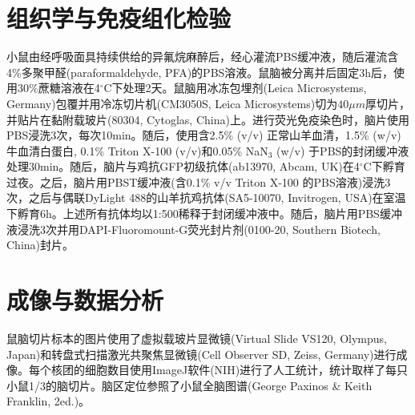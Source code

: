 \section{组织学与免疫组化检验}
小鼠由经呼吸面具持续供给的异氟烷麻醉后，经心灌流PBS缓冲液，随后灌流含4\%多聚甲醛(paraformaldehyde, PFA)的PBS溶液。鼠脑被分离并后固定3h后，使用30\%蔗糖溶液在4$^\circ$C下处理2天。鼠脑用冰冻包埋剂(Leica Microsystems, Germany)包覆并用冷冻切片机(CM3050S, Leica Microsystems)切为$40\mu m$厚切片，并贴片在黏附载玻片(80304, Cytoglas, China)上。进行荧光免疫染色时，脑片使用PBS浸洗3次，每次10min。随后，使用含2.5\% (v/v) 正常山羊血清，1.5\% (w/v) 牛血清白蛋白, 0.1\% Triton\texttrademark{} X-100 (v/v)和0.05\% NaN$_3$ (w/v) 于PBS的封闭缓冲液处理30min。随后，脑片与鸡抗GFP初级抗体(ab13970, Abcam, UK)在4$^\circ$C下孵育过夜。之后，脑片用PBST缓冲液(含0.1\% v/v Triton\texttrademark{} X-100 的PBS溶液)浸洗3次，之后与偶联DyLight 488的山羊抗鸡抗体(SA5-10070, Invitrogen, USA)在室温下孵育6h。上述所有抗体均以1:500稀释于封闭缓冲液中。随后，脑片用PBS缓冲液浸洗3次并用DAPI-Fluoromount-G荧光封片剂(0100-20, Southern Biotech, China)封片。

\section{成像与数据分析}
鼠脑切片标本的图片使用了虚拟载玻片显微镜(Virtual Slide VS120, Olympus, Japan)和转盘式扫描激光共聚焦显微镜(Cell Observer SD, Zeiss, Germany)进行成像。每个核团的细胞数目使用ImageJ软件(NIH)进行了人工统计，统计取样了每只小鼠1/3的脑切片。脑区定位参照了小鼠全脑图谱(George Paxinos \& Keith Franklin, 2ed.)。
